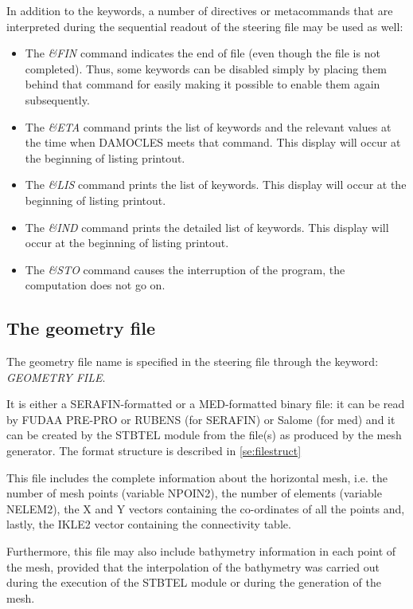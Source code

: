 In addition to the keywords, a number of directives or metacommands that are
interpreted during the sequential readout of the steering file may be used as well:

\begin{itemize}
\item  The \textit{\&FIN} command indicates the end of file (even though the file is
  not completed). Thus, some keywords can be disabled simply by placing them behind
  that command for easily making it possible to enable them again subsequently.

\item  The \textit{\&ETA} command prints the list of keywords and the relevant values
  at the time when DAMOCLES meets that command. This display will occur at the beginning
  of listing printout.

\item  The \textit{\&LIS} command prints the list of keywords. This display will occur
  at the beginning of listing printout.

\item  The \textit{\&IND} command prints the detailed list of keywords. This display
  will occur at the beginning of listing printout.

\item  The \textit{\&STO} command causes the interruption of the program, the
  computation does not go on.
\end{itemize}


\subsection{ The geometry file}

The geometry file name is specified in the steering file through the keyword:
\textit{GEOMETRY FILE}.

It is either a SERAFIN-formatted or a MED-formatted binary file: it can be read by
FUDAA PRE-PRO or RUBENS (for SERAFIN) or Salome (for med) and it can be created by the
STBTEL module from the file(s) as produced by the mesh generator. The format structure
is described in \ref{se:filestruct}

This file includes the complete information about the horizontal mesh, i.e. the number
of mesh points (variable NPOIN2), the number of elements (variable NELEM2), the X and Y
vectors containing the co-ordinates of all the points and, lastly, the IKLE2 vector
containing the connectivity table.

Furthermore, this file may also include bathymetry information in each point of the
mesh, provided that the interpolation of the bathymetry was carried out during the
execution of the STBTEL module or during the generation of the mesh.


